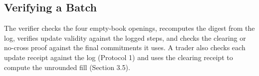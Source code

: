 \subsection{Verifying a Batch}

The verifier checks the four empty-book openings, recomputes the digest from the log, verifies update validity against the logged steps, and checks the clearing or no-cross proof against the final commitments it uses. A trader also checks each update receipt against the log (Protocol 1) and uses the clearing receipt to compute the unrounded fill (Section 3.5).
